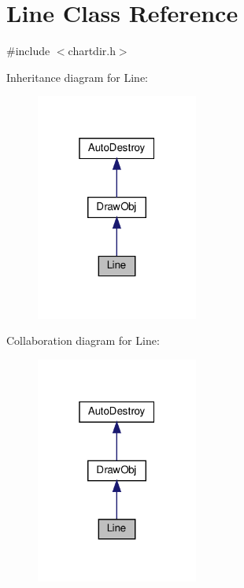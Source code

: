 \hypertarget{class_line}{}\section{Line Class Reference}
\label{class_line}


{\ttfamily \#include $<$chartdir.\+h$>$}



Inheritance diagram for Line\+:
\nopagebreak
\begin{figure}[H]
\begin{center}
\leavevmode
\includegraphics[width=151pt]{class_line__inherit__graph}
\end{center}
\end{figure}


Collaboration diagram for Line\+:
\nopagebreak
\begin{figure}[H]
\begin{center}
\leavevmode
\includegraphics[width=151pt]{class_line__coll__graph}
\end{center}
\end{figure}
